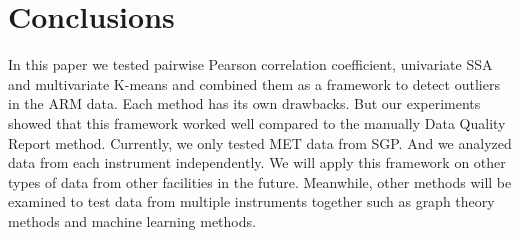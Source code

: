 \section{Conclusions}
In this paper we tested pairwise Pearson correlation coefficient, univariate SSA and multivariate K-means and combined them as a framework to detect outliers in the ARM data. Each method has its own drawbacks. But our experiments showed that this framework worked well compared to the manually Data Quality Report method. Currently, we only tested MET data from SGP. And we analyzed data from each instrument independently. We will apply this framework on other types of data from other facilities in the future. Meanwhile, other methods will be examined to test data from multiple instruments together such as graph theory methods \cite{phillips2015graph} and machine learning methods. 


